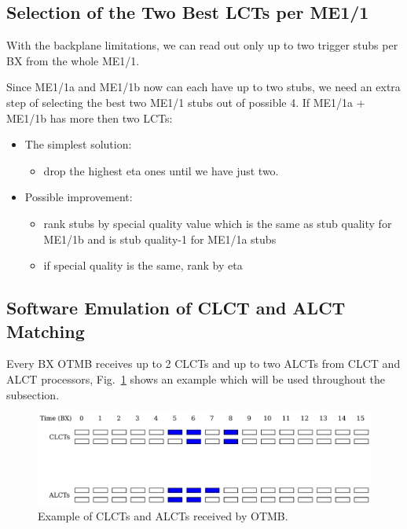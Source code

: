 \subsection{Selection of the Two Best LCTs per ME1/1}

With the backplane limitations, we can read out only up to two trigger stubs per BX from the whole ME1/1.

Since ME1/1a and ME1/1b now can each have up to two stubs, we need an extra step of selecting the best two ME1/1 stubs out of possible 4. If ME1/1a + ME1/1b has more then two LCTs:
\begin{itemize}
    \item The simplest solution:
    \begin{itemize}
	\item drop the highest eta ones until we have just two. 
    \end{itemize}
    \item Possible improvement:
    \begin{itemize}
        \item rank stubs by special quality value which is the same as stub quality for ME1/1b and is stub quality-1 for ME1/1a stubs
        \item if special quality is the same, rank by eta 
    \end{itemize}
\end{itemize}

\newpage
\subsection{Software Emulation of CLCT and ALCT Matching}

Every BX OTMB receives up to 2 CLCTs and up to two ALCTs from CLCT and ALCT processors, Fig.~\ref{fig:clcts_alcts} shows an example which will be used throughout the subsection.

\begin{figure}[tbh]
        \begin{center}
                \includegraphics[width=0.7\linewidth]{figures/clcts_alcts.pdf}
                \caption{Example of CLCTs and ALCTs received by OTMB.}
                \label{fig:clcts_alcts}
        \end{center}
\end{figure}

